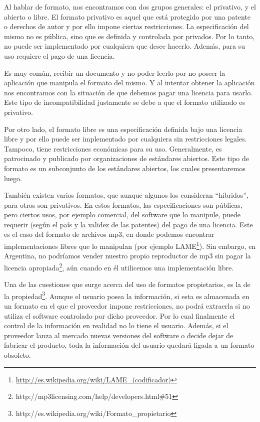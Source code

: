 \documentclass[12pt]{article}
\begin{document}
Al hablar de formato, nos encontramos con dos grupos generales: el privativo, y el abierto o libre. El formato privativo es aquel que está protegido por una patente o derechos de autor y por ello impone ciertas restricciones. La especificación del mismo no es pública, sino que es definida y controlada por privados. Por lo tanto, no puede ser implementado por cualquiera que desee hacerlo. Además, para su uso requiere el pago de una licencia.

Es muy común, recibir un documento y no poder leerlo por no poseer la aplicación que manipula el formato del mismo. Y al intentar obtener la aplicación nos encontramos con la situación de que debemos pagar una licencia para usarlo. Este tipo de incompatibilidad justamente se debe a que el formato utilizado es privativo. 

Por otro lado, el formato libre es una especificación definida bajo una licencia libre y por ello puede ser implementado por cualquiera sin restricciones legales. Tampoco, tiene restricciones económicas para su uso. Generalmente, es patrocinado y publicado por organizaciones de estándares abiertos. Este tipo de formato es un subconjunto de los estándares abiertos, los cuales presentaremos luego.

También existen varios formatos, que aunque algunos los consideran “híbridos”, para otros son privativos. En estos formatos, las especificaciones son públicas, pero ciertos usos, por ejemplo comercial, del software que lo manipule, puede requerir (según el país y la validez de las patentes) del pago de una licencia. Este es el caso del formato de archivos mp3, en donde podemos encontrar implementaciones libres que lo manipulan (por ejemplo LAME\protect\footnote{\url{http://es.wikipedia.org/wiki/LAME_(codificador)}}). Sin embargo, en Argentina, no podríamos vender nuestro propio reproductor de mp3 sin pagar la licencia apropiada\footnote{http://mp3licensing.com/help/developers.html\#51}, aún cuando en él utilicemos una implementación libre. 

Una de las cuestiones que surge acerca del uso de formatos propietarios, es la de la propiedad\footnote{http://es.wikipedia.org/wiki/Formato\_propietario}. Aunque el usuario posea la información, si esta es almacenada en un formato en el que el proveedor impone restricciones, no podrá extraerla si no utiliza el software controlado por dicho proveedor. Por lo cual finalmente el control de la información en realidad no lo tiene el usuario. Además, si el proveedor lanza al mercado nuevas versiones del software o decide dejar de fabricar el producto, toda la información del usuario quedará ligada a un formato obsoleto.  
\end{document}
